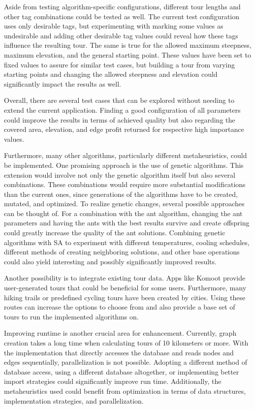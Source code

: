 Aside from testing algorithm-specific configurations, different tour lengths and other tag combinations could be tested as well.
The current test configuration uses only desirable tags, but experimenting with marking some values as undesirable and adding other desirable tag values could reveal how these tags influence the resulting tour.
The same is true for the allowed maximum steepness, maximum elevation, and the general starting point.
These values have been set to fixed values to assure for similar test cases, but building a tour from varying starting points and changing the allowed steepness and elevation could significantly impact the results as well.

Overall, there are several test cases that can be explored without needing to extend the current application.
Finding a good configuration of all parameters could improve the results in terms of achieved quality but also regarding the covered area, elevation, and edge profit returned for respective high importance values. 


Furthermore, many other algorithms, particularly different metaheuristics, could be implemented. 
One promising approach is the use of genetic algorithms.
This extension would involve not only the genetic algorithm itself but also several combinations. 
These combinations would require more substantial modifications than the current ones, since generations of the algorithms have to be created, mutated, and optimized. 
To realize genetic changes, several possible approaches can be thought of. 
For a combination with the ant algorithm, changing the ant parameters and having the ants with the best results survive and create offspring could greatly increase the quality of the ant solutions.
Combining genetic algorithms with SA to experiment with different temperatures, cooling schedules, different methods of creating neighboring solutions, and other base operations could also yield interesting and possibly significantly improved results.

Another possibility is to integrate existing tour data. 
Apps like Komoot provide user-generated tours that could be beneficial for some users.
Furthermore, many hiking trails or predefined cycling tours have been created by cities.
Using these routes can increase the options to choose from and also provide a base set of tours to run the implemented algorithms on.


Improving runtime is another crucial area for enhancement.
Currently, graph creation takes a long time when calculating tours of 10 kilometers or more.
With the implementation that directly accesses the database and reads nodes and edges sequentially, parallelization is not possible.
Adopting a different method of database access, using a different database altogether, or implementing better import strategies could significantly improve run time.
Additionally, the metaheuristics used could benefit from optimization in terms of data structures, implementation strategies, and parallelization.

